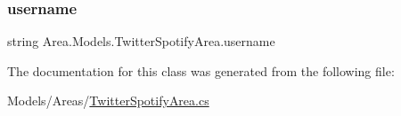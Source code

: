 \mbox{\label{classArea_1_1Models_1_1TwitterSpotifyArea_a08144e22ff5cd628395959a2f0e91f29}} 
\subsubsection{\texorpdfstring{username}{username}}
{\footnotesize\ttfamily string Area.\+Models.\+Twitter\+Spotify\+Area.\+username\hspace{0.3cm}{\ttfamily [private]}}



The documentation for this class was generated from the following file\+:\begin{DoxyCompactItemize}
\item 
Models/\+Areas/\mbox{\hyperlink{TwitterSpotifyArea_8cs}{Twitter\+Spotify\+Area.\+cs}}\end{DoxyCompactItemize}

